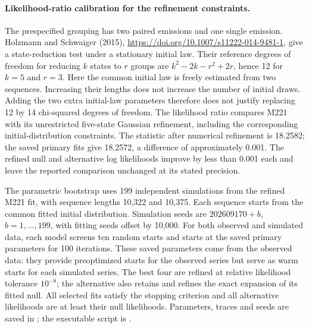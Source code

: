 \documentclass[11pt]{article}
\begin{document}
\paragraph{Likelihood-ratio calibration for the refinement constraints.}
The prespecified grouping has two paired emissions and one single emission.
Holzmann and Schwaiger (2015),
\url{https://doi.org/10.1007/s11222-014-9481-1}, give a state-reduction test
under a stationary initial law. Their reference degrees of freedom for
reducing $k$ states to $r$ groups are $k^2-2k-r^2+2r$, hence 12 for
$k=5$ and $r=3$. Here the common initial law is freely estimated from two
sequences. Increasing their lengths does not increase the number of
initial draws. Adding the two extra initial-law parameters therefore does
not justify replacing 12 by 14 chi-squared degrees of freedom.
The likelihood ratio compares M221 with its unrestricted five-state Gaussian
refinement, including the corresponding initial-distribution constraints.
The statistic after numerical refinement is 18.2582; the saved primary fits
give 18.2572, a difference of approximately 0.001. The refined null and
alternative log likelihoods improve by less than 0.001 each and leave the
reported comparison unchanged at its stated precision.

The parametric bootstrap uses 199 independent simulations from the refined
M221 fit, with sequence lengths 10,322 and 10,375. Each sequence starts from
the common fitted initial distribution. Simulation seeds are
$202609170+b$, $b=1,\ldots,199$, with fitting seeds offset by 10,000.
For both observed and simulated data, each model screens ten random starts
and starts at the saved primary parameters for 100 iterations. These saved
parameters come from the observed data: they provide preoptimized starts for
the observed series but serve as warm starts for each simulated series.
The best four
are refined at relative likelihood tolerance $10^{-8}$; the alternative also
retains and refines the exact expansion of its fitted null. All selected
fits satisfy the stopping criterion and all alternative likelihoods are at
least their null likelihoods. Parameters, traces and seeds are saved in
; the executable script is
.
\end{document}
